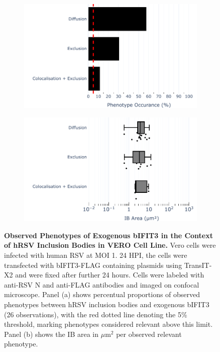 \begin{figure}
    \begin{subfigure}{0.495\textwidth}
        \caption{}
        \includegraphics[width=1\linewidth]{09. Chapter 4/Figs/02. Overexpression/03. IFIT3/01. bar_i3_hrsv.pdf} 
    \end{subfigure}
    \begin{subfigure}{0.495\textwidth}
        \caption{}
        \includegraphics[width=1\linewidth]{09. Chapter 4/Figs/02. Overexpression/03. IFIT3/02. box_i3_hrsv.pdf}
    \end{subfigure}
    \caption[Observed Phenotypes of Exogenous bIFIT3 in the Context of hRSV Inclusion Bodies in VERO Cell Line.]{\textbf{Observed Phenotypes of Exogenous bIFIT3 in the Context of hRSV Inclusion Bodies in VERO Cell Line.} Vero cells were infected with human RSV at MOI 1. 24 HPI, the cells were transfected with bIFIT3-FLAG containing plasmids using TransIT-X2 and were fixed after further 24 hours. Cells were labeled with anti-RSV N and anti-FLAG antibodies and imaged on confocal microscope. Panel (a) shows percentual proportions of observed phenotypes between hRSV inclusion bodies and exogenous bIFIT3 (26 observations), with the red dotted line denoting the 5\% threshold, marking phenotypes considered relevant above this limit. Panel (b) shows the IB area in \(\mu \mbox{m}^2\) per observed relevant phenotype.}
    \label{fig:Observed Phenotypes of Exogenous bIFIT3 in the Context of hRSV Inclusion Bodies in VERO Cell Line}
\end{figure}

